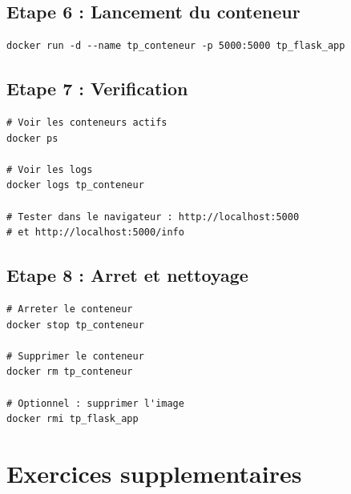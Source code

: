 \documentclass[a4paper,12pt]{article}
\begin{document}
\subsection{Etape 6 : Lancement du conteneur}
\begin{lstlisting}
docker run -d --name tp_conteneur -p 5000:5000 tp_flask_app
\end{lstlisting}

\subsection{Etape 7 : Verification}
\begin{lstlisting}
# Voir les conteneurs actifs
docker ps

# Voir les logs
docker logs tp_conteneur

# Tester dans le navigateur : http://localhost:5000
# et http://localhost:5000/info
\end{lstlisting}

\subsection{Etape 8 : Arret et nettoyage}
\begin{lstlisting}
# Arreter le conteneur
docker stop tp_conteneur

# Supprimer le conteneur
docker rm tp_conteneur

# Optionnel : supprimer l'image
docker rmi tp_flask_app
\end{lstlisting}

\section{Exercices supplementaires}
\end{document}
